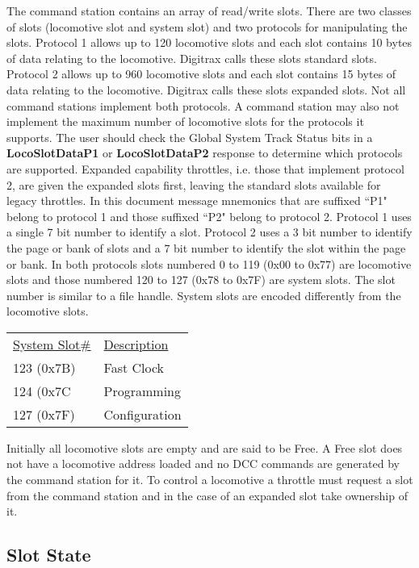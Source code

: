 The command station contains an array of read/write slots. There are two classes of slots (\gls{locomotive slot} and \gls{system slot}) and two protocols for manipulating the slots. Protocol 1 allows up to 120 locomotive slots and each slot contains 10 bytes of data relating to the locomotive. Digitrax calls these slots \gls{standard slots}. Protocol 2 allows up to 960 locomotive slots and each slot contains 15 bytes of data relating to the locomotive. Digitrax calls these slots \gls{expanded slots}. Not all command stations implement both protocols. A command station may also not implement the maximum number of locomotive slots for the protocols it supports.  The user should check the \gls{Global System Track Status} bits in a \textbf{LocoSlotDataP1} or \textbf{LocoSlotDataP2} response to determine which protocols are supported. Expanded capability throttles, i.e. those that implement protocol 2,  are given the expanded slots first, leaving the standard slots available for legacy throttles.  In this document message mnemonics that are suffixed ``P1" belong to protocol 1 and those suffixed ``P2" belong to protocol 2. Protocol 1 uses a single 7 bit number to identify a slot. Protocol 2 uses a 3 bit number to identify the page or bank of slots and a 7 bit number to identify the slot within the page or bank. In both protocols slots numbered 0 to 119 (0x00 to 0x77) are locomotive slots and those numbered 120 to 127 (0x78 to 0x7F) are system slots. The slot number is similar to a file handle. System slots are encoded differently from the locomotive slots. 

\begin{tabular}{l l}
\underline{System Slot\#} & \underline{Description}\\
123 (0x7B) & Fast Clock\\
124 (0x7C & Programming\\
127 (0x7F) & Configuration\\
\end{tabular}

Initially all locomotive slots are empty and are said to be \gls{Free}. A Free slot does not have a locomotive address loaded and no DCC commands are generated by the command station for it. To control a locomotive a \gls{throttle} must request a slot from the command station and in the case of an expanded slot take ownership of it.

\subsection{Slot State}


